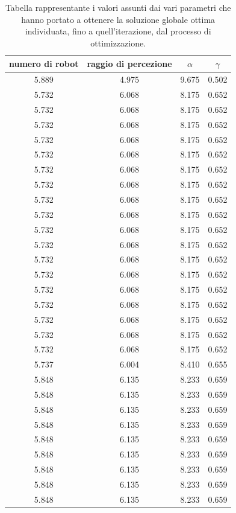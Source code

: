 \begin{longtable}{c|c|c|c}
	\caption{Tabella rappresentante i valori assunti dai vari parametri che hanno portato a ottenere la soluzione globale ottima individuata, fino a quell'iterazione, dal processo di ottimizzazione.} \label{apxtab:vs} \\
	\textbf{numero di robot} & \textbf{raggio di percezione} & \textbf{$\alpha$} & \textbf{$\gamma$} \\
	\hline
	\endfirsthead 
	5.889 & 4.975 & 9.675 & 0.502 \\
	5.732 & 6.068 & 8.175 & 0.652 \\
	5.732 & 6.068 & 8.175 & 0.652 \\
	5.732 & 6.068 & 8.175 & 0.652 \\
	5.732 & 6.068 & 8.175 & 0.652 \\
	5.732 & 6.068 & 8.175 & 0.652 \\
	5.732 & 6.068 & 8.175 & 0.652 \\
	5.732 & 6.068 & 8.175 & 0.652 \\
	5.732 & 6.068 & 8.175 & 0.652 \\
	5.732 & 6.068 & 8.175 & 0.652 \\
	5.732 & 6.068 & 8.175 & 0.652 \\
	5.732 & 6.068 & 8.175 & 0.652 \\
	5.732 & 6.068 & 8.175 & 0.652 \\
	5.732 & 6.068 & 8.175 & 0.652 \\
	5.732 & 6.068 & 8.175 & 0.652 \\
	5.732 & 6.068 & 8.175 & 0.652 \\
	5.732 & 6.068 & 8.175 & 0.652 \\
	5.732 & 6.068 & 8.175 & 0.652 \\
	5.732 & 6.068 & 8.175 & 0.652 \\
	5.737 & 6.004 & 8.410 & 0.655 \\
	5.848 & 6.135 & 8.233 & 0.659 \\
	5.848 & 6.135 & 8.233 & 0.659 \\
	5.848 & 6.135 & 8.233 & 0.659 \\
	5.848 & 6.135 & 8.233 & 0.659 \\
	5.848 & 6.135 & 8.233 & 0.659 \\
	5.848 & 6.135 & 8.233 & 0.659 \\
	5.848 & 6.135 & 8.233 & 0.659 \\
	5.848 & 6.135 & 8.233 & 0.659 \\
	5.848 & 6.135 & 8.233 & 0.659 \\

\end{longtable}
